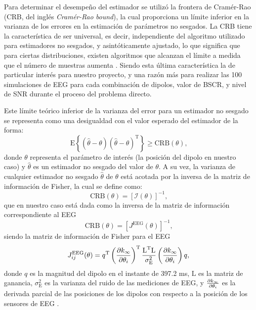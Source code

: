 Para determinar el desempeño del estimador se utilizó la frontera de Cramér-Rao (CRB, del inglés \emph{Cramér-Rao bound}), la cual proporciona un límite inferior en la varianza de los errores en la estimación de parámetros no sesgados.
La CRB tiene la característica de ser universal, es decir, independiente del algoritmo utilizado para estimadores no sesgados, y asintóticamente ajustado, lo que significa que para ciertas distribuciones, existen algoritmos que alcanzan el límite a medida que el número de muestras aumenta \cite{Muravchik1999, Escalona-Vargas2013}.
Siendo esta última característica la de particular interés para nuestro proyecto, y una razón más para realizar las 100 simulaciones de EEG para cada combinación de dipolos, valor de BSCR, y nivel de SNR durante el proceso del problema directo.

Este límite teórico inferior de la varianza del error para un estimador no sesgado se representa como una desigualdad con el valor esperado del estimador de la forma:
\begin{equation}
	\label{eq:crb2}
	\text{E}\left\{(\hat{\theta} - \theta)(\hat{\theta} - \theta)^{\text{T}}\right\} \geq \text{CRB}(\theta)\text{,}
\end{equation}
donde ${\theta}$ representa el parámetro de interés (la posición del dipolo en nuestro caso) y $\hat{\theta}$ es un estimador no sesgado del valor de $\theta$. A su vez, la varianza de cualquier estimador no sesgado $\hat{\theta}$ de $\theta$ está acotada por la inversa de la matriz de información de Fisher, la cual se define como:
\begin{equation}
	\label{eq:crb}
	\text{CRB}(\theta) = \left[\mathcal{I}(\theta)\right]^{-1}\text{,}
\end{equation} 
que en nuestro caso está dada como la inversa de la matriz de información correspondiente al EEG
\begin{equation}
	\label{eq:crb}
	\text{CRB}(\theta) = [J^{\text{EEG}}(\theta)]^{-1}\text{,}
\end{equation} 
siendo la matriz de información de Fisher para el EEG
\begin{equation}
	\label{eq:fisher}
	J_{ij}^{\text{EEG}}(\theta) = q^{\text{T}}\left(\pdv{k_{\infty}}{\theta_{i}}\right)^{\text{T}}\frac{\text{L}^{\text{T}}\text{L}}{\sigma^2_{\text{E}}}\left(\pdv{k_{\infty}}{\theta_{i}}\right)q\text{,}
\end{equation}
donde $q$ es la magnitud del dipolo en el instante de 397.2 ms, $\text{L}$ es la matriz de ganancia, $\sigma^2_{\text{E}}$ es la varianza del ruido de las mediciones de EEG, y $\pdv{k_{\infty}}{\theta_{i}}$ es la derivada parcial de las posiciones de los dipolos con respecto a la posición de los sensores de EEG \cite{nielsenCramerRaoLowerBound2013, Stoica1988, Muravchik1999}. 

